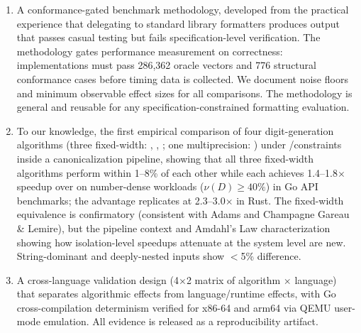 \begin{enumerate}
\item A conformance-gated benchmark methodology, developed from the
      practical experience that delegating to standard library formatters
      produces output that passes casual testing but fails
      specification-level verification.  The methodology gates
      performance measurement on correctness: implementations must pass
      286{,}362 oracle vectors and 776 structural conformance cases
      before timing data is collected.  We document noise floors and
      minimum observable effect sizes for all comparisons.  The
      methodology is general and reusable for any
      specification-constrained formatting evaluation.

\item To our knowledge, the first empirical comparison of four digit-generation algorithms
      (three fixed-width: \schubfach, \ryualg, \dragonbox; one
      multiprecision: \burgerdybvig) under \ecma/\rfcjcs constraints
      inside a canonicalization pipeline, showing that all three
      fixed-width algorithms perform within 1--8\% of each other while
      each achieves 1.4--1.8$\times$ speedup over \burgerdybvig on
      number-dense workloads ($\nu(D) \geq 40\%$) in Go API benchmarks;
      the advantage replicates at 2.3--3.0$\times$ in Rust.  The
      fixed-width equivalence is confirmatory (consistent with Adams
      and Champagne Gareau \& Lemire), but the pipeline context and
      Amdahl's Law characterization showing how isolation-level
      speedups attenuate at the system level are new.
      String-dominant and deeply-nested inputs show $<$5\% difference.

\item A cross-language validation design (4$\times$2 matrix of
      algorithm $\times$ language) that separates algorithmic effects from
      language/runtime effects, with Go cross-compilation determinism
      verified for x86-64 and arm64 via QEMU user-mode emulation.
      All evidence is released as a reproducibility artifact.
\end{enumerate}

